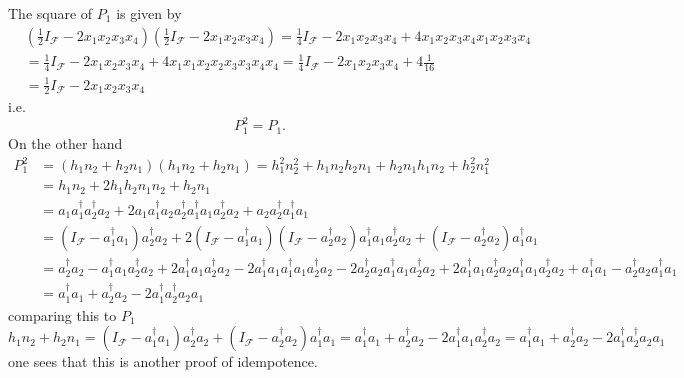 \documentclass[aps,preprint]{revtex4}%
\begin{document}
The square of $P_{1}$ is given by
\begin{align}
&  \left(  \frac{1}{2}I_{\mathcal{F}}-2x_{1}x_{2}x_{3}x_{4}\right)  \left(
\frac{1}{2}I_{\mathcal{F}}-2x_{1}x_{2}x_{3}x_{4}\right)  =\frac{1}%
{4}I_{\mathcal{F}}-2x_{1}x_{2}x_{3}x_{4}+4x_{1}x_{2}x_{3}x_{4}x_{1}x_{2}%
x_{3}x_{4}\\
&  =\frac{1}{4}I_{\mathcal{F}}-2x_{1}x_{2}x_{3}x_{4}+4x_{1}x_{1}x_{2}%
x_{2}x_{3}x_{3}x_{4}x_{4}=\frac{1}{4}I_{\mathcal{F}}-2x_{1}x_{2}x_{3}%
x_{4}+4\frac{1}{16}\\
&  =\frac{1}{2}I_{\mathcal{F}}-2x_{1}x_{2}x_{3}x_{4}%
\end{align}
i.e.
\begin{equation}
P_{1}^{2}=P_{1}.
\end{equation}
On the other hand
\begin{align}
P_{1}^{2}  &  =\left(  h_{1}n_{2}+h_{2}n_{1}\right)  \left(  h_{1}n_{2}%
+h_{2}n_{1}\right)  =h_{1}^{2}n_{2}^{2}+h_{1}n_{2}h_{2}n_{1}+h_{2}n_{1}%
h_{1}n_{2}+h_{2}^{2}n_{1}^{2}\\
&  =h_{1}n_{2}+2h_{1}h_{2}n_{1}n_{2}+h_{2}n_{1}\\
&  =a_{1}a_{1}^{\dagger}a_{2}^{\dagger}a_{2}+2a_{1}a_{1}^{\dagger}a_{2}%
a_{2}^{\dagger}a_{1}^{\dagger}a_{1}a_{2}^{\dagger}a_{2}+a_{2}a_{2}^{\dagger
}a_{1}^{\dagger}a_{1}\\
&  =\left(  I_{\mathcal{F}}-a_{1}^{\dagger}a_{1}\right)  a_{2}^{\dagger}%
a_{2}+2\left(  I_{\mathcal{F}}-a_{1}^{\dagger}a_{1}\right)  \left(
I_{\mathcal{F}}-a_{2}^{\dagger}a_{2}\right)  a_{1}^{\dagger}a_{1}%
a_{2}^{\dagger}a_{2}+\left(  I_{\mathcal{F}}-a_{2}^{\dagger}a_{2}\right)
a_{1}^{\dagger}a_{1}\\
&  =a_{2}^{\dagger}a_{2}-a_{1}^{\dagger}a_{1}a_{2}^{\dagger}a_{2}%
+2a_{1}^{\dagger}a_{1}a_{2}^{\dagger}a_{2}-2a_{1}^{\dagger}a_{1}a_{1}%
^{\dagger}a_{1}a_{2}^{\dagger}a_{2}-2a_{2}^{\dagger}a_{2}a_{1}^{\dagger}%
a_{1}a_{2}^{\dagger}a_{2}+2a_{1}^{\dagger}a_{1}a_{2}^{\dagger}a_{2}%
a_{1}^{\dagger}a_{1}a_{2}^{\dagger}a_{2}+a_{1}^{\dagger}a_{1}-a_{2}^{\dagger
}a_{2}a_{1}^{\dagger}a_{1}\\
&  =a_{1}^{\dagger}a_{1}+a_{2}^{\dagger}a_{2}-2a_{1}^{\dagger}a_{2}^{\dagger
}a_{2}a_{1}%
\end{align}
comparing this to $P_{1}$
\begin{equation}
h_{1}n_{2}+h_{2}n_{1}=\left(  I_{\mathcal{F}}-a_{1}^{\dagger}a_{1}\right)
a_{2}^{\dagger}a_{2}+\left(  I_{\mathcal{F}}-a_{2}^{\dagger}a_{2}\right)
a_{1}^{\dagger}a_{1}=a_{1}^{\dagger}a_{1}+a_{2}^{\dagger}a_{2}-2a_{1}%
^{\dagger}a_{1}a_{2}^{\dagger}a_{2}=a_{1}^{\dagger}a_{1}+a_{2}^{\dagger}%
a_{2}-2a_{1}^{\dagger}a_{2}^{\dagger}a_{2}a_{1}%
\end{equation}
one sees that this is another proof of idempotence.
\end{document}

